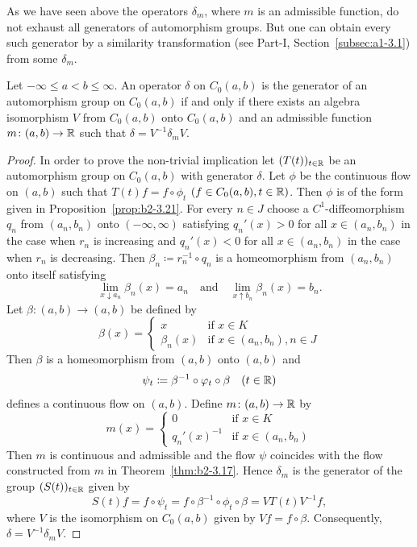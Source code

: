 As we have seen above the operators $\delta_{m}$, where $m$ is an admissible function, do not exhaust all generators of automorphism groups.
But one can obtain every such generator by a similarity transformation (see Part-I, Section~\ref{subsec:a1-3.1}) from some $\delta_{m}$.
\begin{theorem}\label{thm:b2-3.24}
%
Let $-\infty \leq a < b \leq \infty$.
An operator $\delta$ on $C_{0}(a,b)$ is the generator of an automorphism group on $C_{0}(a,b)$ if and only if there exists an algebra isomorphism $V$ from $C_{0}(a,b)$ onto $C_{0}(a,b)$ and an admissible function $m \colon (a,b) \to \mathbb{R}$ such that $\delta = V^{-1}\delta_{m}V$.
\end{theorem}
\begin{proof}
In order to prove the non-trivial implication let $(T(t))_{t \in \mathbb{R}}$ be an automorphism group on $C_{0}(a,b)$ with generator $\delta$.
Let $\phi$ be the continuous flow on $(a,b)$ such that $T(t)f = f \circ \phi_{t}$ $(f \in C_{0}(a,b), t \in \mathbb{R})$.
Then $\phi$ is of the form given in Proposition~\ref{prop:b2-3.21}.
For every $n \in J$ choose a $C^{1}$-diffeomorphism $q_{n}$ from $(a_{n},b_{n})$ onto $(-\infty,\infty)$ satisfying $q_{n}'(x) > 0$ for all $x \in (a_{n},b_{n})$ in the case when $r_{n}$ is increasing and $q_{n}'(x) < 0$ for all $x \in (a_{n},b_{n})$ in the case when $r_{n}$ is decreasing.
Then $\beta_{n} \coloneq r_{n}^{-1} \circ q_{n}$ is a homeomorphism from $(a_{n},b_{n})$ onto itself satisfying 
%
\[
	\lim_{x \downarrow a_{n}}\beta_{n}(x) = a_{n} \quad \text{and} \quad 
	\lim_{x \uparrow b_{n}}\beta_{n}(x) = b_{n} . 
\]
%
Let $\beta \colon (a,b) \to (a,b)$ be defined by
\begin{equation*}\label{eq:b2-beta}
\beta(x) = \begin{cases}
    x & \text{if } x \in K \\
    \beta_{n}(x) & \text{if } x \in (a_{n},b_{n}), n \in J
\end{cases}
\end{equation*}
Then $\beta$ is a homeomorphism from $(a,b)$ onto $(a,b)$ and 
\[
	\psi_{t} \coloneq \beta^{-1} \circ \phi_{t} \circ \beta \quad (t \in \R)
\]
%
defines a continuous flow on $(a,b)$.
Define $m \colon (a,b) \to \mathbb{R}$ by
\begin{equation*}\label{eq:b2-m-def2}
m(x) = \begin{cases}
    0 & \text{if } x \in K \\
    q_{n}'(x)^{-1} & \text{if } x \in (a_{n},b_{n})
\end{cases}
\end{equation*}
Then $m$ is continuous and admissible and the flow $\psi$ coincides with the flow constructed from $m$ in Theorem~\ref{thm:b2-3.17}.
Hence $\delta_{m}$ is the generator of the group $(S(t))_{t \in \mathbb{R}}$ given by 
%
\[
	S(t)f = f \circ \psi_{t} = f \circ \beta^{-1} \circ \phi_{t} \circ \beta = VT(t)V^{-1}f ,
\]
%
where $V$ is the isomorphism on $C_{0}(a,b)$ given by $Vf = f \circ \beta$.
Consequently, $\delta = V^{-1}\delta_{m}V$.
\end{proof}
